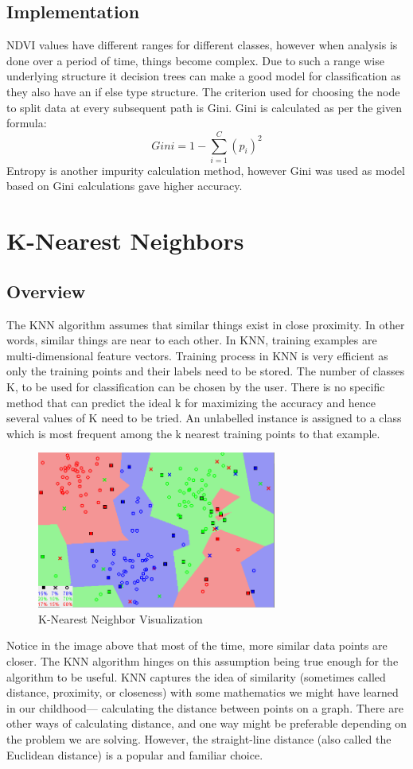 \documentclass[12pt, a4paper]{report}
\begin{document}
\subsection{Implementation}
NDVI values have different ranges for different classes, however when analysis is done over a period of time, things become complex. Due to such a range wise  underlying structure it decision trees can make a good model for classification as they also have an if else type structure. The criterion used for choosing the node to split data at every subsequent path is Gini. Gini is calculated as per the given formula:
\begin{displaymath}
Gini=1-\sum_{i=1}^{C}(p_i)^2
\end{displaymath}
Entropy is another impurity calculation method, however Gini was used as model based on Gini calculations gave higher accuracy.
\section{K-Nearest Neighbors}
\subsection{Overview}
The KNN algorithm assumes that similar things exist in close proximity. In other words, similar things are near to each other. In KNN, training examples are multi-dimensional feature vectors. Training process in KNN is very efficient as only the training points and their labels need to be stored. The number of classes K, to be used for classification can be chosen by the user. There is no specific method that can predict the ideal k for maximizing the accuracy and hence several values of K need to be tried. An unlabelled instance is assigned to a class which is most frequent among the k nearest training points to that example.
\begin{figure}[h]
\centering
\includegraphics[width=0.7\textwidth]{knnone.png}
\caption{K-Nearest Neighbor Visualization}
\end{figure}
Notice in the image above that most of the time, more similar data points are closer. The KNN algorithm hinges on this assumption being true enough for the algorithm to be useful. KNN captures the idea of similarity (sometimes called distance, proximity, or closeness) with some mathematics we might have learned in our childhood— calculating the distance between points on a graph. There are other ways of calculating distance, and one way might be preferable depending on the problem we are solving. However, the straight-line distance (also called the Euclidean distance) is a popular and familiar choice.
\end{document}
